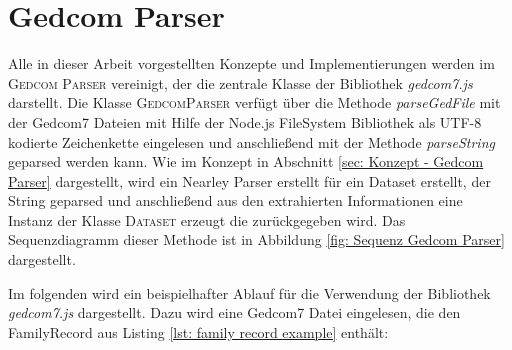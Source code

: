 \section{Gedcom Parser}
\label{sec: Implementierung - Gedcom Parser}
Alle in dieser Arbeit vorgestellten Konzepte und Implementierungen werden im \textsc{Gedcom Parser} vereinigt, der die zentrale Klasse der Bibliothek \textit{gedcom7.js} darstellt. Die Klasse \textsc{GedcomParser} verfügt über die Methode \textit{parseGedFile} mit der Gedcom7 Dateien mit Hilfe der Node.js FileSystem Bibliothek als UTF-8 kodierte Zeichenkette eingelesen und anschließend mit der Methode \textit{parseString} geparsed werden kann. Wie im Konzept in Abschnitt \ref{sec: Konzept - Gedcom Parser} dargestellt, wird ein Nearley Parser erstellt für ein Dataset erstellt, der String geparsed und anschließend aus den extrahierten Informationen eine Instanz der Klasse \textsc{Dataset} erzeugt die zurückgegeben wird. Das Sequenzdiagramm dieser Methode ist in Abbildung \ref{fig: Sequenz Gedcom Parser} dargestellt.


Im folgenden wird ein beispielhafter Ablauf für die Verwendung der Bibliothek \textit{gedcom7.js} dargestellt. Dazu wird eine Gedcom7 Datei eingelesen, die den FamilyRecord aus Listing \ref{lst: family record example} enthält:

